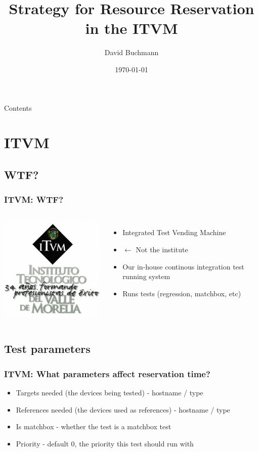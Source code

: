 \documentclass[xcolor=pdftex,dvipsnames,table]{beamer}
\title{Strategy for Resource Reservation in the ITVM}
\subtitle{}
\author{David Buchmann}
\institute{Cisco Systems}
\date{\today}
\begin{document}
\maketitle

\begin{frame}[allowframebreaks]{Contents}
  \tableofcontents
\end{frame}

\section{ITVM}

\subsection{WTF?}
\begin{frame}
  \frametitle{ITVM: WTF?}
  \begin{columns}[cc]
  \column{0.5in}
  \includegraphics[scale=0.33]{itvm.jpg}
  \column{2.0in}
  \begin{itemize}
    \item Integrated Test Vending Machine
    \item $\leftarrow$ Not the institute
    \item Our in-house continous integration test running system
    \item Runs tests (regression, matchbox, etc)
  \end{itemize}
  \end{columns}
\end{frame}

\subsection{Test parameters}
\begin{frame}
  \frametitle{ITVM: What parameters affect reservation time?}
  \begin{itemize}
    \item Targets needed (the devices being tested) - hostname / type
    \item References needed (the devices used as references) -
      hostname / type
    \item Is matchbox - whether the test is a matchbox test
    \item Priority - default 0, the priority this test should run with
  \end{itemize}
\end{frame}
\end{document}
